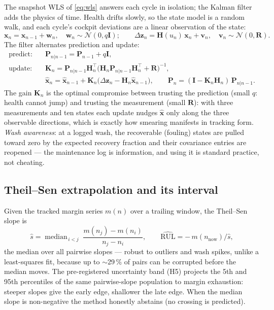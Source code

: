 The snapshot WLS of \cref{eq:wls} answers each cycle in isolation; the Kalman filter adds
the physics of time. Health drifts slowly, so the state model is a random walk, and each
cycle's cockpit deviations are a linear observation of the state:
\begin{equation}
  \mathbf{x}_n = \mathbf{x}_{n-1} + \mathbf{w}_n, \quad \mathbf{w}_n \sim \mathcal{N}(0, q\mathbf{I});
  \qquad
  \Delta\mathbf{z}_n = \mathbf{H}(u_n)\,\mathbf{x}_n + \mathbf{v}_n, \quad \mathbf{v}_n \sim \mathcal{N}(0, \mathbf{R}).
  \label{eq:kalman-model}
\end{equation}
The filter alternates prediction and update:
\begin{align}
  \text{predict:}\quad & \mathbf{P}_{n|n-1} = \mathbf{P}_{n-1} + q\mathbf{I}, \nonumber\\
  \text{update:}\quad  & \mathbf{K}_n = \mathbf{P}_{n|n-1}\mathbf{H}_n^{\!\top}
      \bigl(\mathbf{H}_n \mathbf{P}_{n|n-1}\mathbf{H}_n^{\!\top} + \mathbf{R}\bigr)^{-1}, \nonumber\\
  & \hat{\mathbf{x}}_n = \hat{\mathbf{x}}_{n-1} + \mathbf{K}_n\bigl(\Delta\mathbf{z}_n - \mathbf{H}_n\hat{\mathbf{x}}_{n-1}\bigr), \qquad
    \mathbf{P}_n = (\mathbf{I} - \mathbf{K}_n\mathbf{H}_n)\,\mathbf{P}_{n|n-1}.
  \label{eq:kalman-update}
\end{align}
The gain $\mathbf{K}_n$ is the optimal compromise between trusting the prediction
(small $q$: health cannot jump) and trusting the measurement (small $\mathbf{R}$): with
three measurements and ten states each update nudges $\hat{\mathbf{x}}$ only along the
three observable directions, which is exactly how smearing manifests in tracking form.
\emph{Wash awareness}: at a logged wash, the recoverable (fouling) states are pulled toward
zero by the expected recovery fraction and their covariance entries are reopened ---
the maintenance log is information, and using it is standard practice, not cheating.

\subsection{Theil--Sen extrapolation and its interval}
\label{sec:math-theilsen}

Given the tracked margin series $m(n)$ over a trailing window, the Theil--Sen slope is
\begin{equation}
  \hat{s} = \operatorname{median}_{\,i<j}\; \frac{m(n_j) - m(n_i)}{n_j - n_i},
  \qquad
  \widehat{\mathrm{RUL}} = -\,m(n_{\text{now}})/\hat{s},
  \label{eq:theilsen}
\end{equation}
the median over all pairwise slopes --- robust to outliers and wash spikes, unlike a
least-squares fit, because up to $\sim$29\,\% of pairs can be corrupted before the median
moves. The pre-registered uncertainty band (H5) projects the 5th and 95th percentiles of
the same pairwise-slope population to margin exhaustion: steeper slopes give the early
edge, shallower the late edge. When the median slope is non-negative the method honestly
abstains (no crossing is predicted).

